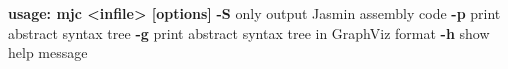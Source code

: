  \textbf{usage: mjc <infile> [options]}
  \textbf{-S}         only output Jasmin assembly code
  \textbf{-p}         print abstract syntax tree
  \textbf{-g}         print abstract syntax tree in GraphViz format
  \textbf{-h}         show help message
